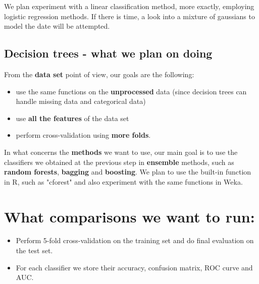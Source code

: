 \documentclass[a4paper,11pt]{article}
\begin{document}
We plan experiment with a linear classification method, more exactly, employing logistic regression methods. If there is time, a look into a mixture of gaussians to model the date will be attempted. 

\subsection*{Decision trees - what we plan on doing}
 	From the \textbf{data set} point of view, our goals are the following:
 	\begin{itemize}
 		\item  use the same functions on the \textbf{unprocessed} data (since decision trees can handle missing data and categorical data)
 		\item use \textbf{all the features} of the data set
 		\item perform cross-validation using \textbf{more folds}.
 	\end{itemize}
In what concerns the \textbf{methods} we want to use, our main goal is to use the classifiers we obtained at the previous step in \textbf{ensemble} methods, such as \textbf{random forests}, \textbf{bagging} and \textbf{boosting}. We plan to use the built-in function in R, such as "cforest" and also experiment with the same functions in Weka.





\section*{What comparisons we want to run:}

\begin{itemize}
	\item Perform 5-fold cross-validation on the training set and do final evaluation on the test set.
	\item For each classifier we store their accuracy, confusion matrix, ROC curve and AUC.
\end{itemize}
\end{document}
